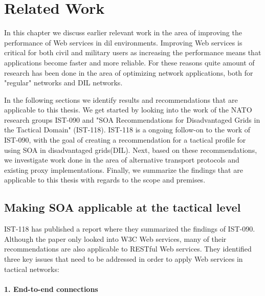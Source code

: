 \chapter{Related Work}

In this chapter we discuss earlier relevant work in the area of improving the
performance of Web services in \gls{dil} environments. Improving Web services
is critical for both civil and military users as increasing the performance
means that applications become faster and more reliable. For these reasons
quite amount of research has been done in the area of optimizing network
applications, both for "regular" networks and DIL networks.

In the following sections we identify results and recommendations that are
applicable to this thesis. We get started by looking into the work of the NATO
research groups IST-090 and "SOA Recommendations for Disadvantaged Grids in
the Tactical Domain" (IST-118). IST-118 is a ongoing follow-on to the work of
IST-090, with the goal of creating a recommendation for a tactical profile for
using SOA in disadvantaged grids(DIL). Next, based on these recommendations, we
investigate work done in the area of alternative transport protocols and
existing proxy implementations.  Finally, we summarize the findings that are
applicable to this thesis with regards to the scope and premises.

\section{Making SOA applicable at the tactical level}

IST-118 has published a report where they summarized the findings of IST-090.
Although the paper only looked into W3C Web services, many of their
recommendations are also applicable to RESTful Web services. They identified
three key issues that need to be addressed in order to apply Web services in
tactical networks\cite{ist-090, ist-118}:

\label{section:DIL-problems}

\subsubsection{1. End-to-end connections}

